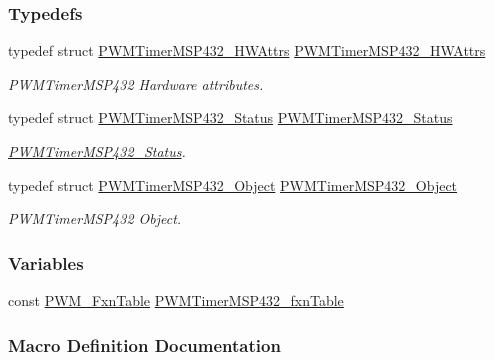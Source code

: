 \subsubsection*{Typedefs}
\begin{DoxyCompactItemize}
\item 
typedef struct \hyperlink{struct_p_w_m_timer_m_s_p432___h_w_attrs}{P\+W\+M\+Timer\+M\+S\+P432\+\_\+\+H\+W\+Attrs} \hyperlink{_p_w_m_timer_m_s_p432_8h_a63353889735b1371acd138ea0927cefc}{P\+W\+M\+Timer\+M\+S\+P432\+\_\+\+H\+W\+Attrs}
\begin{DoxyCompactList}\small\item\em P\+W\+M\+Timer\+M\+S\+P432 Hardware attributes. \end{DoxyCompactList}\item 
typedef struct \hyperlink{struct_p_w_m_timer_m_s_p432___status}{P\+W\+M\+Timer\+M\+S\+P432\+\_\+\+Status} \hyperlink{_p_w_m_timer_m_s_p432_8h_af75fb1cc6f34e3383ce5d416b90961de}{P\+W\+M\+Timer\+M\+S\+P432\+\_\+\+Status}
\begin{DoxyCompactList}\small\item\em \hyperlink{struct_p_w_m_timer_m_s_p432___status}{P\+W\+M\+Timer\+M\+S\+P432\+\_\+\+Status}. \end{DoxyCompactList}\item 
typedef struct \hyperlink{struct_p_w_m_timer_m_s_p432___object}{P\+W\+M\+Timer\+M\+S\+P432\+\_\+\+Object} \hyperlink{_p_w_m_timer_m_s_p432_8h_af38839ac281ee06be9b0aaa2b5f04d13}{P\+W\+M\+Timer\+M\+S\+P432\+\_\+\+Object}
\begin{DoxyCompactList}\small\item\em P\+W\+M\+Timer\+M\+S\+P432 Object. \end{DoxyCompactList}\end{DoxyCompactItemize}
\subsubsection*{Variables}
\begin{DoxyCompactItemize}
\item 
const \hyperlink{struct_p_w_m___fxn_table}{P\+W\+M\+\_\+\+Fxn\+Table} \hyperlink{_p_w_m_timer_m_s_p432_8h_a59f5d0f3c3d7da66fbfb61dc70dcac30}{P\+W\+M\+Timer\+M\+S\+P432\+\_\+fxn\+Table}
\end{DoxyCompactItemize}


\subsubsection{Macro Definition Documentation}
